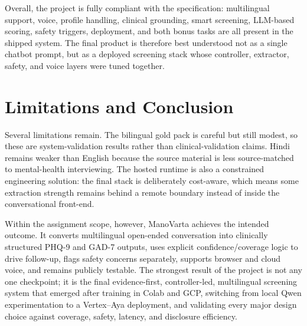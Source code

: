 \documentclass[11pt]{article}
\begin{document}
Overall, the project is fully compliant with the specification: multilingual support, voice, profile handling, clinical grounding, smart screening, LLM-based scoring, safety triggers, deployment, and both bonus tasks are all present in the shipped system. The final product is therefore best understood not as a single chatbot prompt, but as a deployed screening stack whose controller, extractor, safety, and voice layers were tuned together.

\section{Limitations and Conclusion}
Several limitations remain. The bilingual gold pack is careful but still modest, so these are system-validation results rather than clinical-validation claims. Hindi remains weaker than English because the source material is less source-matched to mental-health interviewing. The hosted runtime is also a constrained engineering solution: the final stack is deliberately cost-aware, which means some extraction strength remains behind a remote boundary instead of inside the conversational front-end.

Within the assignment scope, however, ManoVarta achieves the intended outcome. It converts multilingual open-ended conversation into clinically structured PHQ-9 and GAD-7 outputs, uses explicit confidence/coverage logic to drive follow-up, flags safety concerns separately, supports browser and cloud voice, and remains publicly testable. The strongest result of the project is not any one checkpoint; it is the final evidence-first, controller-led, multilingual screening system that emerged after training in Colab and GCP, switching from local Qwen experimentation to a Vertex--Aya deployment, and validating every major design choice against coverage, safety, latency, and disclosure efficiency.



\end{document}
